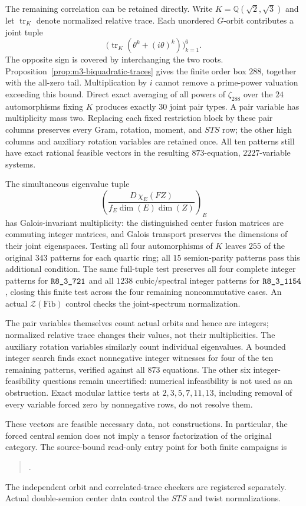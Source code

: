 The remaining correlation can be retained directly. Write
$K=\mathbb Q(\sqrt2,\sqrt3)$ and let $\operatorname{tr}_K$ denote normalized
relative trace. Each unordered $G$-orbit contributes a joint tuple
\[
 \bigl(\operatorname{tr}_K(\theta^k+(i\theta)^k)\bigr)_{k=1}^{6}.
\]
The opposite sign is covered by interchanging the two roots.
Proposition~\ref{prop:m3-biquadratic-traces} gives the finite order box
$288$, together with the all-zero tail. Multiplication by $i$ cannot
remove a prime-power valuation exceeding this bound. Direct exact
averaging of all powers of $\zeta_{288}$ over the $24$ automorphisms fixing
$K$ produces exactly $30$ joint pair types. A pair variable has
multiplicity mass two. Replacing each fixed restriction block by these
pair columns preserves every Gram, rotation, moment, and $STS$ row;
the other high columns and auxiliary rotation variables are retained once.
All ten patterns still have exact rational feasible vectors in the
resulting $873$-equation, $2227$-variable systems.

The simultaneous eigenvalue tuple
\[
 \left(\frac{D\,\chi_E(FZ)}{f_E\dim(E)\dim(Z)}\right)_E
\]
has Galois-invariant multiplicity: the distinguished center fusion
matrices are commuting integer matrices, and Galois transport preserves
the dimensions of their joint eigenspaces. Testing all four automorphisms
of $K$ leaves $255$ of the original $343$ patterns for each quartic ring;
all $15$ semion-parity patterns pass this additional condition.
The same full-tuple test preserves all four complete integer patterns for
$\sha{R8_3_721}$ and all $1238$ cubic/spectral integer patterns for
$\sha{R8_3_1154}$, closing this finite test across the four remaining
noncommutative cases. An actual
$\mathcal Z(\mathrm{Fib})$ control checks the joint-spectrum normalization.

The pair variables themselves count actual orbits and hence are integers;
normalized relative trace changes their values, not their multiplicities.
The auxiliary rotation variables similarly count individual eigenvalues.
A bounded integer search finds exact nonnegative integer witnesses for
four of the ten remaining patterns, verified against all $873$ equations.
The other six integer-feasibility questions remain uncertified: numerical
infeasibility is not used as an obstruction. Exact modular lattice tests
at $2,3,5,7,11,13$, including removal of every variable forced zero by
nonnegative rows, do not resolve them.

These vectors are feasible necessary data, not constructions. In
particular, the forced central semion does not imply a tensor
factorization of the original category. The source-bound read-only
entry point for both finite campaigns is
\begin{quote}\small
{}.
\end{quote}
The independent orbit and correlated-trace checkers are registered
separately. Actual double-semion center data control the $STS$ and twist
normalizations.

